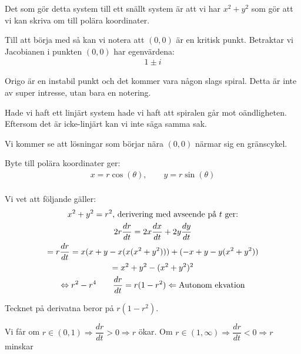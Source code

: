 \par\bigskip
\noindent Det som gör detta system till ett snällt system är att vi har $x^2+y^2$ som gör att vi kan skriva om till polära koordinater.\par
\noindent Till att börja med så kan vi notera att $(0,0)$ är en kritisk punkt. Betraktar vi Jacobianen i punkten $(0,0)$ har egenvärdena:
\begin{equation*}
  \begin{gathered}
    1\pm i
  \end{gathered}
\end{equation*}
\par\bigskip
\noindent Origo är en instabil punkt och det kommer vara någon slags spiral. Detta är inte av super intresse, utan bara en notering.\par
\noindent Hade vi haft ett linjärt system hade vi haft att spiralen går mot oändligheten. Eftersom det är icke-linjärt kan vi inte säga samma sak.
\par\bigskip
\noindent Vi kommer se att lösningar som börjar nära $(0,0)$ närmar sig en gränscykel.
\par\bigskip
\noindent Byte till polära koordinater ger:
\begin{equation*}
  \begin{gathered}
    x = r\cos(\theta),\qquad y=r\sin(\theta)\\
  \end{gathered}
\end{equation*}\par
\noindent Vi vet att följande gäller:
\begin{equation*}
  \begin{gathered}
    x^2+y^2=r^2\text{, derivering med avseende på $t$ ger:}\\
  2r\dfrac{dr}{dt} = 2x\dfrac{dx}{dt}+2y\dfrac{dy}{dt}\\
  = r\dfrac{dr}{dt}=x(x+y-x(x(x^2+y^2)))+(-x+y-y(x^2+y^2))\\
  = x^2+y^2-(x^2+y^2)^2\\
  \Leftrightarrow r^2-r^4\qquad \dfrac{dr}{dt} = r(1-r^2)\Leftarrow\text{Autonom ekvation}
  \end{gathered}
\end{equation*}
\par\bigskip
\noindent Tecknet på derivatna beror på $r(1-r^2)$.\par
\noindent Vi får om $r\in(0,1)\Rightarrow\dfrac{dr}{dt}>0\Rightarrow r$ ökar.
\noindent Om $r\in(1,\infty)\Rightarrow\dfrac{dr}{dt}<0\Rightarrow r$ minskar\par
